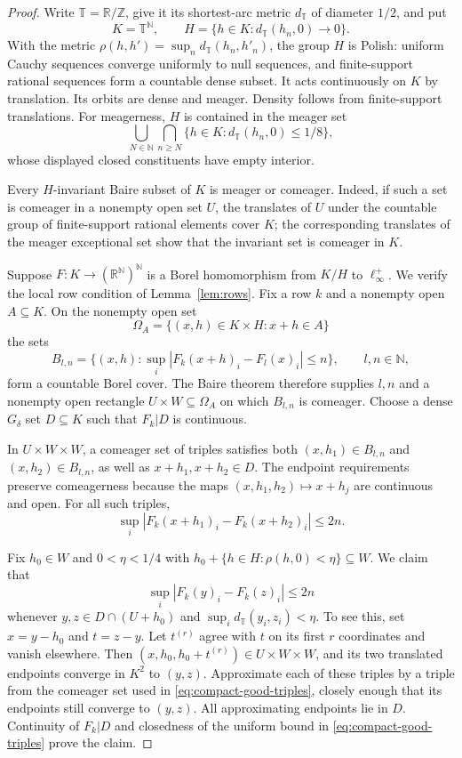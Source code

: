 \documentclass[11pt]{article}
\numberwithin{equation}{section}
\theoremstyle{definition}
\begin{document}
\begin{proof}
Write $\mathbb T=\mathbb R/\mathbb Z$, give it its shortest-arc metric
$d_{\mathbb T}$ of diameter $1/2$, and put
\[
 K=\mathbb T^{\mathbb N},\qquad
 H=\{h\in K:d_{\mathbb T}(h_n,0)\longrightarrow0\}.
\]
With the metric
$\rho(h,h')=\sup_n d_{\mathbb T}(h_n,h'_n)$, the group $H$ is Polish:
uniform Cauchy sequences converge uniformly to null sequences, and
finite-support rational sequences form a countable dense subset.
It acts continuously on $K$ by translation. Its orbits are dense and
meager. Density follows from finite-support translations. For
meagerness, $H$ is contained in the meager set
\[
 \bigcup_{N\in\mathbb N}\bigcap_{n\ge N}
 \{h\in K:d_{\mathbb T}(h_n,0)\le1/8\},
\]
whose displayed closed constituents have empty interior.

Every $H$-invariant Baire subset of $K$ is meager or comeager. Indeed, if
such a set is comeager in a nonempty open set $U$, the translates of $U$
under the countable group of finite-support rational elements cover $K$;
the corresponding translates of the meager exceptional set show that
the invariant set is comeager in $K$.

Suppose $F:K\to(\mathbb R^{\mathbb N})^{\mathbb N}$ is a Borel
homomorphism from $K/H$ to $\ell_\infty^+$. We verify the local row
condition of Lemma~\ref{lem:rows}. Fix a row $k$ and a nonempty open
$A\subseteq K$. On the nonempty open set
\[
 \Omega_A=\{(x,h)\in K\times H:x+h\in A\}
\]
the sets
\[
 B_{l,n}=\{(x,h):
       \sup_i|F_k(x+h)_i-F_l(x)_i|\le n\},
 \qquad l,n\in\mathbb N,
\]
form a countable Borel cover. The Baire theorem therefore supplies
$l,n$ and a nonempty open rectangle $U\times W\subseteq\Omega_A$ on
which $B_{l,n}$ is comeager. Choose a dense $G_\delta$ set $D\subseteq K$
such that $F_k|D$ is continuous.

In $U\times W\times W$, a comeager set of triples satisfies both
$ (x,h_1)\in B_{l,n}$ and $(x,h_2)\in B_{l,n}$, as well as
$x+h_1,x+h_2\in D$. The endpoint requirements preserve comeagerness
because the maps $(x,h_1,h_2)\mapsto x+h_j$ are continuous and open.
For all such triples,
\begin{equation}
\label{eq:compact-good-triples}
 \sup_i|F_k(x+h_1)_i-F_k(x+h_2)_i|\le2n.
\end{equation}

Fix $h_0\in W$ and $0<\eta<1/4$ with
$h_0+\{h\in H:\rho(h,0)<\eta\}\subseteq W$.
We claim that
\begin{equation}
\label{eq:compact-small-pairs}
 \sup_i|F_k(y)_i-F_k(z)_i|\le2n
\end{equation}
whenever $y,z\in D\cap(U+h_0)$ and
$\sup_i d_{\mathbb T}(y_i,z_i)<\eta$.
To see this, set $x=y-h_0$ and $t=z-y$. Let $t^{(r)}$ agree with $t$ on
its first $r$ coordinates and vanish elsewhere. Then
$(x,h_0,h_0+t^{(r)})\in U\times W\times W$, and its two translated
endpoints converge in $K^2$ to $(y,z)$. Approximate each of these triples
by a triple from the comeager set used in
\eqref{eq:compact-good-triples}, closely enough that its endpoints still
converge to $(y,z)$. All approximating endpoints lie in $D$.
Continuity of $F_k|D$ and closedness of the uniform bound in
\eqref{eq:compact-good-triples} prove the claim.


\end{proof}
\end{document}
